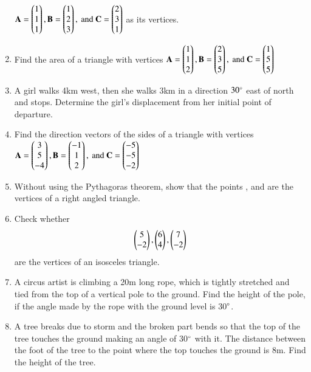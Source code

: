 \begin{enumerate}[label=\arabic*.,ref=\thesubsection.\theenumi]
$
\mathbf{A} = \begin{pmatrix}1\\1 \\1\end{pmatrix},
\mathbf{B} = \begin{pmatrix}1\\2 \\3\end{pmatrix}, \text{ and }
\mathbf{C} = \begin{pmatrix}2\\ 3\\1\end{pmatrix}
$
as its vertices.
\item Find the area of a triangle with vertices
$
\mathbf{A} = \begin{pmatrix}1\\1 \\2\end{pmatrix},
\mathbf{B} = \begin{pmatrix}2\\3 \\5\end{pmatrix}, \text{ and }
\mathbf{C} = \begin{pmatrix}1\\ 5\\5\end{pmatrix}
$
\item A girl walks 4km west, then she walks 3km in a direction $30\degree$ east of north and stops.  Determine the girl's displacement from her initial point of departure.
\item Find the direction vectors of the sides of a triangle with vertices
$
\mathbf{A} = \begin{pmatrix}3\\5 \\-4\end{pmatrix},
\mathbf{B} = \begin{pmatrix}-1\\1 \\2\end{pmatrix}, \text{ and }
\mathbf{C} = \begin{pmatrix}-5\\ -5\\-2\end{pmatrix}
$
\item Without using the Pythagoras theorem, show that the points ,  and  are the vertices of a right angled triangle.
\item Check whether 
\begin{align}
\begin{pmatrix}5\\-2\end{pmatrix}, \begin{pmatrix}6\\4\end{pmatrix}, \begin{pmatrix}7\\-2\end{pmatrix}
\end{align}
are the vertices of an isosceles triangle.
%
\item A circus artist is climbing a 20m long rope, which is tightly stretched and tied from the top of a vertical pole to the ground.  Find the height of the pole, if the angle made by the rope with the ground level is 30$\degree$.
%
\item A tree breaks due to storm and the broken part bends so that the top of the tree touches the ground making an angle of 30$\degree$ with it.  The distance between the foot of the tree to the point where the top touches the ground is 8m.  Find the height of the tree.

\end{enumerate}
